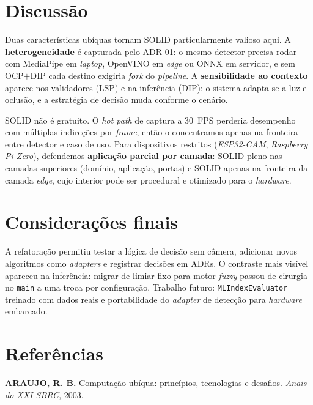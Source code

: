 \documentclass[12pt]{article}
\begin{document}
\section{Discussão}
\label{sec:discussao}

\hspace{1,27cm}Duas características ubíquas tornam SOLID particularmente valioso aqui. A \textbf{heterogeneidade} é capturada pelo ADR-01: o mesmo detector precisa rodar com MediaPipe em \textit{laptop}, OpenVINO em \textit{edge} ou ONNX em servidor, e sem OCP$+$DIP cada destino exigiria \textit{fork} do \textit{pipeline}. A \textbf{sensibilidade ao contexto} aparece nos validadores (LSP) e na inferência (DIP): o sistema adapta-se a luz e oclusão, e a estratégia de decisão muda conforme o cenário.

SOLID não é gratuito. O \textit{hot path} de captura a 30~FPS perderia desempenho com múltiplas indireções por \textit{frame}, então o concentramos apenas na fronteira entre detector e caso de uso. Para dispositivos restritos (\textit{ESP32-CAM}, \textit{Raspberry Pi Zero}), defendemos \textbf{aplicação parcial por camada}: SOLID pleno nas camadas superiores (domínio, aplicação, portas) e SOLID apenas na fronteira da camada \textit{edge}, cujo interior pode ser procedural e otimizado para o \textit{hardware}.

\section{Considerações finais}

\hspace{1,27cm}A refatoração permitiu testar a lógica de decisão sem câmera, adicionar novos algoritmos como \textit{adapters} e registrar decisões em ADRs. O contraste mais visível apareceu na inferência: migrar de limiar fixo para motor \textit{fuzzy} passou de cirurgia no \texttt{main} a uma troca por configuração. Trabalho futuro: \texttt{MLIndexEvaluator} treinado com dados reais e portabilidade do \textit{adapter} de detecção para \textit{hardware} embarcado.

\vspace{6pt}
\section*{Referências}

\noindent \textbf{ARAUJO, R. B.} Computação ubíqua: princípios, tecnologias e desafios. \textit{Anais do XXI SBRC}, 2003.
\end{document}

